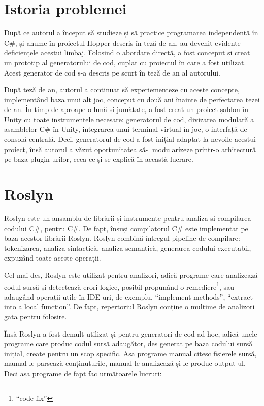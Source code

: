 \documentclass[a4paper,12pt]{report}
\begin{document}
\section{Istoria problemei}

După ce autorul a început să studieze și să practice programarea independentă în C\#, și anume în proiectul Hopper descris în teză de an, au devenit evidente deficiențele acestui limbaj.
Folosind o abordare directă, a fost conceput și creat un prototip al generatorului de cod, cuplat cu proiectul în care a fost utilizat.
Acest generator de cod s-a descris pe scurt în teză de an al autorului.

După teză de an, autorul a continuat să experiementeze cu aceste concepte, implementând baza unui alt joc, conceput cu două ani înainte de perfectarea tezei de an.
În timp de aproape o lună și jumătate, a fost creat un proiect-șablon în Unity cu toate instrumentele necesare: generatorul de cod, divizarea modulară a asamblelor C\# în Unity, integrarea unui terminal virtual în joc, o interfață de consolă centrală\cite{particular_project}.
Deci, generatorul de cod a fost inițial adaptat la nevoile acestui proiect, însă autorul a văzut oportunitatea să-l modularizeze printr-o arhitectură pe baza plugin-urilor, ceea ce și se explică în această lucrare.

\section{Roslyn}


Roslyn este un ansamblu de librării și instrumente pentru analiza și compilarea codului C\#, pentru C\#.
De fapt, însuși compilatorul C\# este implementat pe baza acestor librării Roslyn.
Roslyn combină întregul pipeline de compilare: tokenizarea, analiza sintactică, analiza semantică, generarea codului executabil, expuzând toate aceste operații.

Cel mai des, Roslyn este utilizat pentru analizori, adică programe care analizează codul sursă și detectează erori logice, posibil propunând o remediere\footnote{``code fix''}, sau adaugând operații utile în IDE-uri, de exemplu, ``implement methods'', ``extract into a local function''.
De fapt, repertoriul Roslyn conține o mulțime de analizori gata pentru folosire.

Însă Roslyn a fost demult utilizat și pentru generatori de cod ad hoc, adică unele programe care produc codul sursă adaugător, des generat pe baza codului sursă inițial, create pentru un scop specific.
Așa programe manual citesc fișierele sursă, manual le parsează conținuturile, manual le analizează și le produc output-ul.
Deci așa programe de fapt fac următoarele lucruri:
\end{document}
